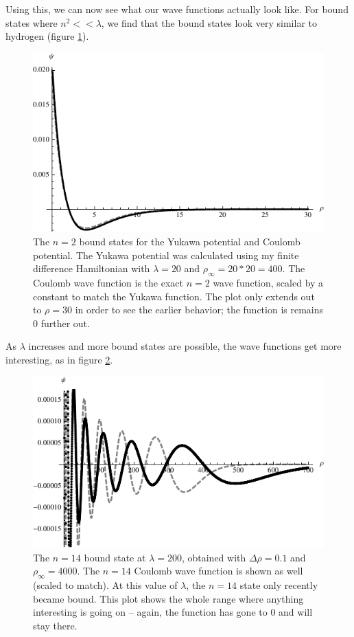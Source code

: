 \documentclass[12pt,twoside]{reedthesis}
\begin{document}
Using this, we can now see what our wave functions actually look like. For bound states where $n^2 << \lambda$, we find that the bound states look very similar to hydrogen (figure \ref{fig:hyd-yukawa}).
\begin{figure}[h]
\centering
\includegraphics{Figures/n2hydyukawa}
\caption[The $n = 2$ bound states for the Yukawa potential and Coulomb potential]{The $n = 2$ bound states for the Yukawa potential and Coulomb potential. The Yukawa potential was calculated using my finite difference Hamiltonian with $\lambda = 20$ and  $\rho_{\infty} = 20*20 = 400$. The Coulomb wave function is the exact $n=2$ wave function, scaled by a constant to match the Yukawa function. The plot only extends out to $\rho = 30$ in order to see the earlier behavior; the function is remains 0 further out.}
\label{fig:hyd-yukawa}
\end{figure}
As $\lambda$ increases and more bound states are possible, the wave functions get more interesting, as in figure \ref{fig:largebound}.
\begin{figure}[h!]
\centering
\includegraphics{Figures/largebound}
\caption[The $n=14$ bound state at $\lambda = 200$]{The $n=14$ bound state at $\lambda = 200$, obtained with $\Delta \rho = 0.1$ and $\rho_{\infty} = 4000$. The $n=14$ Coulomb wave function is shown as well (scaled to match). At this value of $\lambda$, the $n=14$ state only recently became bound. This plot shows the whole range where anything interesting is going on -- again, the function has gone to 0 and will stay there.}
\label{fig:largebound}
\end{figure}
\end{document}

